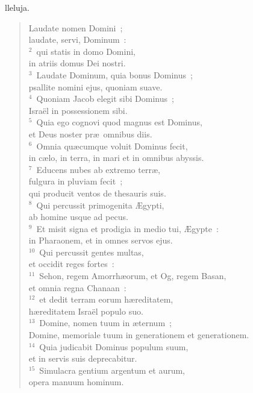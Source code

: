 \bchapter[Psalm]
lleluja. \begin{verse}Laudate nomen Domini~;\\ laudate, servi, Dominum~:\\
${}^{2}$~qui statis in domo Domini,\\ in atriis domus Dei nostri.\\
${}^{3}$~Laudate Dominum, quia bonus Dominus~;\\ psallite nomini ejus, quoniam suave.\\
${}^{4}$~Quoniam Jacob elegit sibi Dominus~;\\ Isra\"el in possessionem sibi.\\
${}^{5}$~Quia ego cognovi quod magnus est Dominus,\\ et Deus noster pr\ae\ omnibus diis.\\
${}^{6}$~Omnia qu\ae cumque voluit Dominus fecit,\\ in c\ae lo, in terra, in mari et in omnibus abyssis.\\
${}^{7}$~Educens nubes ab extremo terr\ae ,\\ fulgura in pluviam fecit~;\\ qui producit ventos de thesauris suis.\\
${}^{8}$~Qui percussit primogenita \AE gypti,\\ ab homine usque ad pecus.\\
${}^{9}$~Et misit signa et prodigia in medio tui, \AE gypte~:\\ in Pharaonem, et in omnes servos ejus.\\
${}^{10}$~Qui percussit gentes multas,\\ et occidit reges fortes~:\\
${}^{11}$~Sehon, regem Amorrh\ae orum, et Og, regem Basan,\\ et omnia regna Chanaan~:\\
${}^{12}$~et dedit terram eorum h\ae reditatem,\\ h\ae reditatem Isra\"el populo suo.\\
${}^{13}$~Domine, nomen tuum in \ae ternum~;\\ Domine, memoriale tuum in generationem et generationem.\\
${}^{14}$~Quia judicabit Dominus populum suum,\\ et in servis suis deprecabitur.\\
${}^{15}$~Simulacra gentium argentum et aurum,\\ opera manuum hominum.\\

\end{verse}
